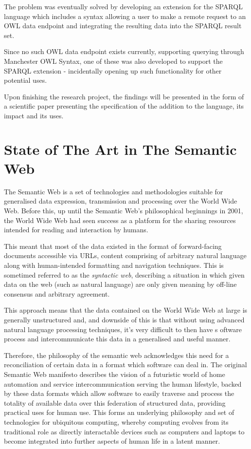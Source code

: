 \documentclass{article}
\begin{document}
The problem was eventually solved by developing an extension for the SPARQL
language which includes a syntax allowing a user to make a remote request to an
OWL data endpoint and integrating the resulting data into the SPARQL result set. 

Since no such OWL data endpoint exists currently, supporting querying through
Manchester OWL Syntax, one of these was also developed to support the SPARQL
extension - incidentally opening up such functionality for other potential uses.

Upon finishing the research project, the findings will be presented in the form
of a scientific paper presenting the specification of the addition to the
language, its impact and its uses.

\section{State of The Art in The Semantic Web}

The Semantic Web is a set of technologies and methodologies suitable for
generalised data expression, transmission and processing over the World Wide
Web. Before this, up until the Semantic Web's philosophical beginnings in
2001, the World Wide Web had seen success as a platform for the
sharing resources intended for reading and interaction by humans.

This meant that most of the data existed in the format of forward-facing 
documents accessible via URLs, content comprising of arbitrary natural language
along with human-intended formatting and navigation techniques. This is
sometimed referred to as the \emph{syntactic web}, describing a situation in
which given data on the web (such as natural language) are only given meaning by
off-line consensus and arbitrary agreement.\cite{syntweb}

This approach means that the data contained on the World Wide Web at large is
generally unstructured and, and downside of this is that without using advanced 
natural language  processing techniques, it's very difficult to then have s
oftware process and intercommunicate this data in a generalised and useful manner.

Therefore, the philosophy of the semantic web acknowledges this need for a
reconciliation of certain data in a format which software can deal in. The
original Semantic Web manifesto\cite{semweb} describes the vision of a 
futuristic world of home automation and service intercommunication serving 
the human lifestyle, backed by these data formats which allow software to 
easily traverse and process the totality of available data over this federation
of structured data, providing practical uses for human use. This forms an
underlying philosophy and set of technologies for ubiquitous computing,
whereby computing evolves from its traditional role as directly interactable
devices such as computers and laptops to become integrated into further
aspects of human life in a latent manner.
\end{document}

